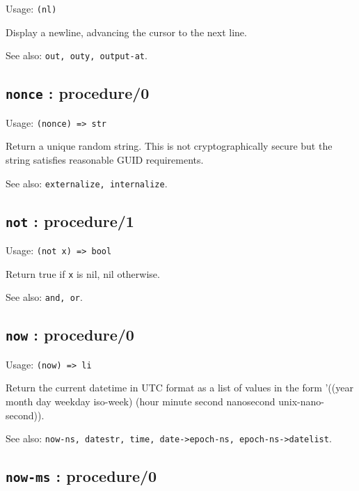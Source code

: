 \documentclass[
]{article}
\newcommand{\passthrough}[1]{#1}
\begin{document}
Usage: \passthrough{\lstinline!(nl)!}

Display a newline, advancing the cursor to the next line.

See also: \passthrough{\lstinline!out, outy, output-at!}.

\hypertarget{nonce-procedure0-1}{%
\subsection{\texorpdfstring{\texttt{nonce} :
procedure/0}{nonce : procedure/0}}\label{nonce-procedure0-1}}

Usage: \passthrough{\lstinline!(nonce) => str!}

Return a unique random string. This is not cryptographically secure but
the string satisfies reasonable GUID requirements.

See also: \passthrough{\lstinline!externalize, internalize!}.

\hypertarget{not-procedure1-1}{%
\subsection{\texorpdfstring{\texttt{not} :
procedure/1}{not : procedure/1}}\label{not-procedure1-1}}

Usage: \passthrough{\lstinline!(not x) => bool!}

Return true if \passthrough{\lstinline!x!} is nil, nil otherwise.

See also: \passthrough{\lstinline!and, or!}.

\hypertarget{now-procedure0-1}{%
\subsection{\texorpdfstring{\texttt{now} :
procedure/0}{now : procedure/0}}\label{now-procedure0-1}}

Usage: \passthrough{\lstinline!(now) => li!}

Return the current datetime in UTC format as a list of values in the
form '((year month day weekday iso-week) (hour minute second nanosecond
unix-nano-second)).

See also:
\passthrough{\lstinline!now-ns, datestr, time, date->epoch-ns, epoch-ns->datelist!}.

\hypertarget{now-ms-procedure0-1}{%
\subsection{\texorpdfstring{\texttt{now-ms} :
procedure/0}{now-ms : procedure/0}}\label{now-ms-procedure0-1}}
\end{document}
